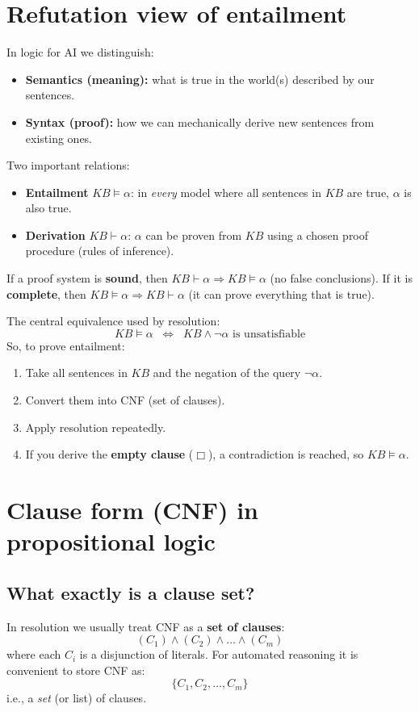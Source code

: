 \documentclass[11pt]{article}
\begin{document}
\section{Refutation view of entailment}
In logic for AI we distinguish:
\begin{itemize}[leftmargin=*]
  \item \textbf{Semantics (meaning):} what is true in the world(s) described by our sentences.
  \item \textbf{Syntax (proof):} how we can mechanically derive new sentences from existing ones.
\end{itemize}

Two important relations:
\begin{itemize}[leftmargin=*]
  \item \textbf{Entailment} $KB \models \alpha$: in \emph{every} model where all sentences in $KB$ are true, $\alpha$ is also true.
  \item \textbf{Derivation} $KB \vdash \alpha$: $\alpha$ can be proven from $KB$ using a chosen proof procedure (rules of inference).
\end{itemize}

If a proof system is \textbf{sound}, then $KB \vdash \alpha \Rightarrow KB \models \alpha$ (no false conclusions).
If it is \textbf{complete}, then $KB \models \alpha \Rightarrow KB \vdash \alpha$ (it can prove everything that is true).

The central equivalence used by resolution:
\[
  KB \models \alpha \;\;\Leftrightarrow\;\; KB \land \lnot \alpha \text{ is unsatisfiable}
\]
So, to prove entailment:
\begin{enumerate}[leftmargin=*]
  \item Take all sentences in $KB$ and the negation of the query $\lnot\alpha$.
  \item Convert them into CNF (set of clauses).
  \item Apply resolution repeatedly.
  \item If you derive the \textbf{empty clause} ($\Box$), a contradiction is reached, so $KB \models \alpha$.
\end{enumerate}

\section{Clause form (CNF) in propositional logic}
\subsection{What exactly is a clause set?}
In resolution we usually treat CNF as a \textbf{set of clauses}:
\[
  (C_1) \land (C_2) \land \dots \land (C_m)
\]
where each $C_i$ is a disjunction of literals.
For automated reasoning it is convenient to store CNF as:
\[
  \{C_1, C_2, \dots, C_m\}
\]
i.e., a \emph{set} (or list) of clauses.
\end{document}

